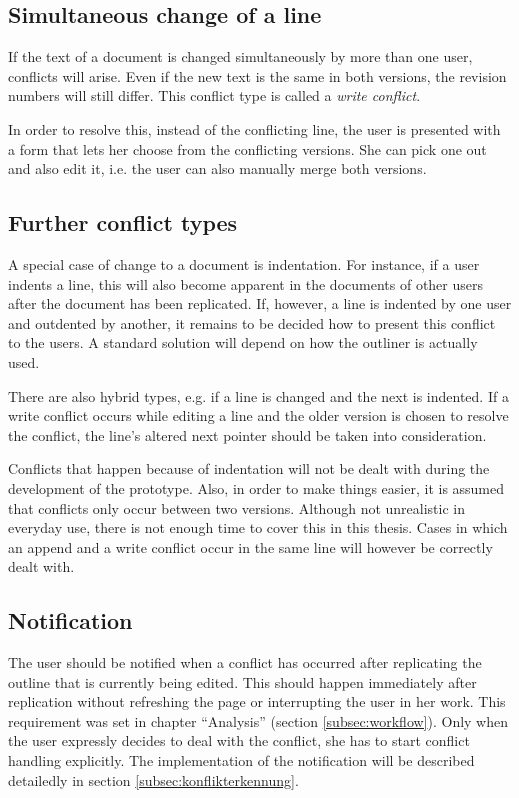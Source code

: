  
\subsection{Simultaneous change of a line}
\label{subsec:writekonfl-arch}

If the text of a document is changed simultaneously by more than one user, conflicts will arise. Even if the new text is the same in both versions, the revision numbers will still differ. This conflict type is called a \textit{write conflict}.

In order to resolve this, instead of the conflicting line, the user is presented with a form that lets her choose from the conflicting versions. She can pick one out and also edit it, i.e. the user can also manually merge both versions.


\subsection{Further conflict types}
\label{subsec:otherconflicts-design}

A special case of change to a document is indentation. For instance, if a user indents a line, this will also become apparent in the documents of other users after the document has been replicated. If, however, a line is indented by one user and outdented by another, it remains to be decided how to present this conflict to the users. A standard solution will depend on how the outliner is actually used.

There are also hybrid types, e.g. if a line is changed and the next is indented. If a write conflict occurs while editing a line and the older version is chosen to resolve the conflict, the line's altered next pointer should be taken into consideration.

Conflicts that happen because of indentation will not be dealt with during the development of the prototype. Also, in order to make things easier, it is assumed that conflicts only occur between two versions. Although not unrealistic in everyday use, there is not enough time to cover this in this thesis. Cases in which an append and a write conflict occur in the same line will however be correctly dealt with.

\subsection{Notification}

The user should be notified when a conflict has occurred after replicating the outline that is currently being edited. This should happen immediately after replication without refreshing the page or interrupting the user in her work. This requirement was set in chapter \enquote{Analysis} (section \ref{subsec:workflow}). Only when the user expressly decides to deal with the conflict, she has to start conflict handling explicitly. The implementation of the notification will be described detailedly in section \ref{subsec:konflikterkennung}.


